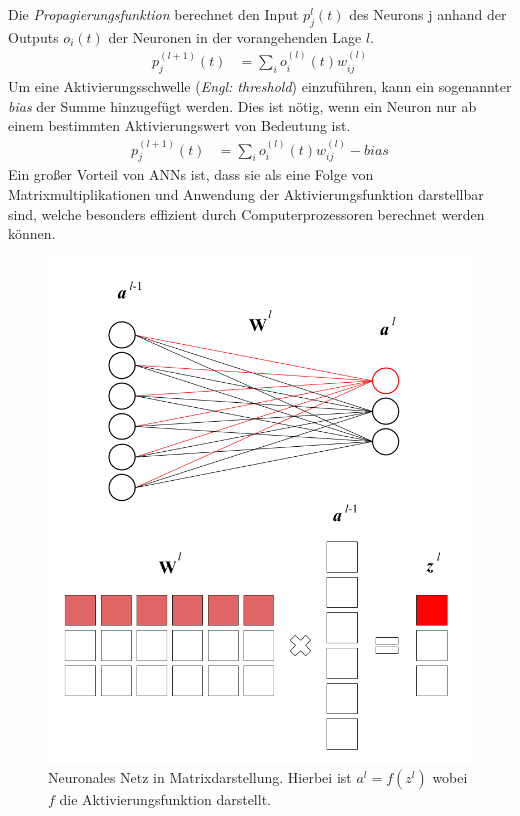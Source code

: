 \documentclass{thesisclass}
\begin{document}
Die \textit{Propagierungsfunktion} berechnet den Input $p_j^{l}(t)$ des Neurons j anhand der Outputs $o_i(t)$ der Neuronen in der vorangehenden Lage $l$.
\begin{align*}
p_j^{(l+1)}(t) &= \sum_{i}^{} o_i^{(l)}(t) w_{ij}^{(l)}
\end{align*}
Um eine Aktivierungsschwelle (\textit{Engl: threshold}) einzuführen, kann ein sogenannter \textit{bias} der Summe hinzugefügt werden. Dies ist nötig, wenn ein Neuron nur ab einem bestimmten Aktivierungswert von Bedeutung ist.
\begin{align*}
p_j^{(l+1)}(t) &= \sum_{i}^{} o_i^{(l)}(t) w_{ij}^{(l)} - bias
\end{align*}
Ein großer Vorteil von \gls{ANN}s ist, dass sie als eine Folge von Matrixmultiplikationen und Anwendung der Aktivierungsfunktion darstellbar sind, welche besonders effizient durch Computerprozessoren berechnet werden können.
\begin{center}
\begin{figure}[H]
		\center
  		\includegraphics[scale=0.3]{images/NNMatrix.png}
  		\caption{Neuronales Netz in Matrixdarstellung. Hierbei ist $a^{l} = f(z^{l})$ wobei $f$ die Aktivierungsfunktion darstellt. \cite{hallstroem_2016}}
  		\label{fig:Neuronales Netz in Matrixdarstellung}
\end{figure}
\end{center}
\end{document}
